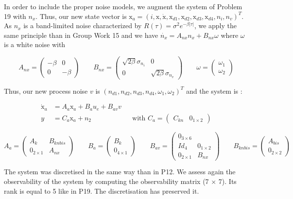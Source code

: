In order to include the proper noise models, we augment the system of Problem 19 with $n_x$. Thus, our new state vector is $\text{x}_a = (i, \text{x}, \dot{\text{x}}, \text{x}_{d1}, \text{x}_{d2}, \text{x}_{d3}, \text{x}_{d4}, n_i, n_v)^T$. As $n_x$ is a band-limited noise characterized by $R(\tau)=\sigma^2e^{-\beta|\tau|}$, we apply the same principle than in Group Work 15 and we have $\dot{n_x}=A_{nx}n_x+B_{nx}\omega$ where $\omega$ is a white noise with

\begin{equation*}
  A_{nx} = \begin{pmatrix}
   -\beta & 0 \\
	0 & -\beta
\end{pmatrix}
\qquad B_{nx} = \begin{pmatrix}
	\sqrt{2\beta}\sigma_{n_i} & 0 \\
	0 & \sqrt{2\beta}\sigma_{n_v} 
\end{pmatrix}
\qquad \omega = \begin{pmatrix}
	\omega_1 \\
	\omega_2
	\end{pmatrix}
\end{equation*}

Thus, our new process noise $v$ is $(n_{d1}, n_{d2}, n_{d3}, n_{d4}, \omega_1, \omega_2)^T$ and the system is :

\begin{align*}
\dot{\text{x}}_a &= A_a \text{x}_a + B_a u_e + B_{av} v \\
y &= C_a \text{x}_a + n_2 \qquad \qquad \qquad \text{with }C_{a} = \begin{pmatrix}
	C_{kn} & 0_{1\times 2}
	\end{pmatrix}
\end{align*}

\begin{equation*}
  A_{a} = \begin{pmatrix}
   A_k & B_{kn bis} \\
	0_{2\times 1} & A_{nx}
\end{pmatrix}
\qquad B_{a} = \begin{pmatrix}
	B_k \\
	0_{4\times 1}
\end{pmatrix}
\qquad B_{av} = \begin{pmatrix}
	0_{3\times 6} \\
	Id_{4} & 0_{1\times 2} \\
	0_{2\times 1} & B_{nx}
	\end{pmatrix}
	\qquad B_{kn bis} = \begin{pmatrix}
	A_{bis}\\
	0_{2\times 2}
	\end{pmatrix}
\end{equation*}

The system was discretised in the same way than in P12. We assess again the observability of the system by computing the observability matrix (7 $\times$ 7). Its rank is equal to 5 like in P19. The discretisation has preserved it.